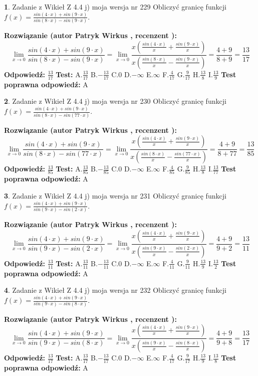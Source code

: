 \documentclass[12pt, a4paper]{article}
\theoremstyle{definition} %
\newtheorem{zad}{}
\newcommand{\zadStart}[1]{\begin{zad}#1\newline}
\newcommand{\zadStop}{\end{zad}}
\newcommand{\rozwStart}[2]{\noindent \textbf{Rozwiązanie (autor #1 , recenzent #2): }\newline}
\newcommand{\rozwStop}{\newline}
\newcommand{\odpStart}{\noindent \textbf{Odpowiedź:}\newline}
\newcommand{\odpStop}{\newline}
\newcommand{\testStart}{\noindent \textbf{Test:}\newline}
\newcommand{\testStop}{\newline}
\newcommand{\kluczStart}{\noindent \textbf{Test poprawna odpowiedź:}\newline}
\newcommand{\kluczStop}{\newline}
\begin{document}
\zadStart{Zadanie z Wikieł Z 4.4 j) moja wersja nr 229}
Obliczyć granicę funkcji $f(x)=\frac{sin(4\cdot x) +sin(9\cdot x)}{sin(8\cdot x) -sin(9\cdot x)}$.
\zadStop
\rozwStart{Patryk Wirkus}{}
$$\lim\limits_{x\to 0}\frac{sin(4\cdot x) +sin(9\cdot x)}{sin(8\cdot x) -sin(9\cdot x)}=\lim\limits_{x\to 0}\frac{x(\frac{sin(4\cdot x)}{x}+\frac{sin(9\cdot x)}{x})}{x(\frac{sin(8\cdot x)}{x}-\frac{sin(9\cdot x)}{x})}=\frac{4+9}{8+9} = \frac{13}{17}$$
\rozwStop
\odpStart
$\frac{13}{17}$
\odpStop
\testStart
A.$\frac{13}{17}$
B.$-\frac{13}{17}$
C.$0$
D.$-\infty$
E.$\infty$
F.$\frac{4}{17}$
G.$\frac{9}{17}$
H.$\frac{13}{8}$
I.$\frac{13}{9}$
\testStop
\kluczStart
A
\kluczStop



\zadStart{Zadanie z Wikieł Z 4.4 j) moja wersja nr 230}
Obliczyć granicę funkcji $f(x)=\frac{sin(4\cdot x) +sin(9\cdot x)}{sin(8\cdot x) -sin(77\cdot x)}$.
\zadStop
\rozwStart{Patryk Wirkus}{}
$$\lim\limits_{x\to 0}\frac{sin(4\cdot x) +sin(9\cdot x)}{sin(8\cdot x) -sin(77\cdot x)}=\lim\limits_{x\to 0}\frac{x(\frac{sin(4\cdot x)}{x}+\frac{sin(9\cdot x)}{x})}{x(\frac{sin(8\cdot x)}{x}-\frac{sin(77\cdot x)}{x})}=\frac{4+9}{8+77} = \frac{13}{85}$$
\rozwStop
\odpStart
$\frac{13}{85}$
\odpStop
\testStart
A.$\frac{13}{85}$
B.$-\frac{13}{85}$
C.$0$
D.$-\infty$
E.$\infty$
F.$\frac{4}{85}$
G.$\frac{9}{85}$
H.$\frac{13}{8}$
I.$\frac{13}{77}$
\testStop
\kluczStart
A
\kluczStop



\zadStart{Zadanie z Wikieł Z 4.4 j) moja wersja nr 231}
Obliczyć granicę funkcji $f(x)=\frac{sin(4\cdot x) +sin(9\cdot x)}{sin(9\cdot x) -sin(2\cdot x)}$.
\zadStop
\rozwStart{Patryk Wirkus}{}
$$\lim\limits_{x\to 0}\frac{sin(4\cdot x) +sin(9\cdot x)}{sin(9\cdot x) -sin(2\cdot x)}=\lim\limits_{x\to 0}\frac{x(\frac{sin(4\cdot x)}{x}+\frac{sin(9\cdot x)}{x})}{x(\frac{sin(9\cdot x)}{x}-\frac{sin(2\cdot x)}{x})}=\frac{4+9}{9+2} = \frac{13}{11}$$
\rozwStop
\odpStart
$\frac{13}{11}$
\odpStop
\testStart
A.$\frac{13}{11}$
B.$-\frac{13}{11}$
C.$0$
D.$-\infty$
E.$\infty$
F.$\frac{4}{11}$
G.$\frac{9}{11}$
H.$\frac{13}{9}$
I.$\frac{13}{2}$
\testStop
\kluczStart
A
\kluczStop



\zadStart{Zadanie z Wikieł Z 4.4 j) moja wersja nr 232}
Obliczyć granicę funkcji $f(x)=\frac{sin(4\cdot x) +sin(9\cdot x)}{sin(9\cdot x) -sin(8\cdot x)}$.
\zadStop
\rozwStart{Patryk Wirkus}{}
$$\lim\limits_{x\to 0}\frac{sin(4\cdot x) +sin(9\cdot x)}{sin(9\cdot x) -sin(8\cdot x)}=\lim\limits_{x\to 0}\frac{x(\frac{sin(4\cdot x)}{x}+\frac{sin(9\cdot x)}{x})}{x(\frac{sin(9\cdot x)}{x}-\frac{sin(8\cdot x)}{x})}=\frac{4+9}{9+8} = \frac{13}{17}$$
\rozwStop
\odpStart
$\frac{13}{17}$
\odpStop
\testStart
A.$\frac{13}{17}$
B.$-\frac{13}{17}$
C.$0$
D.$-\infty$
E.$\infty$
F.$\frac{4}{17}$
G.$\frac{9}{17}$
H.$\frac{13}{9}$
I.$\frac{13}{8}$
\testStop
\kluczStart
A
\kluczStop
\end{document}
